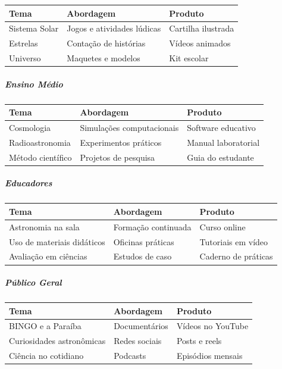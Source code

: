 \bigskip\noindent
\begin{tabular}{p{}p{}p{}}
\toprule
Tema & Abordagem & Produto \\
\hline
Sistema Solar & Jogos e atividades lúdicas & Cartilha ilustrada \\
Estrelas & Contação de histórias & Vídeos animados \\
Universo & Maquetes e modelos & Kit escolar \\
\bottomrule
\end{tabular}

\bigskip

\subparagraph{Ensino Médio}

\bigskip\noindent
\begin{tabular}{p{}p{}p{}}
\toprule
Tema & Abordagem & Produto \\
\hline
Cosmologia & Simulações computacionais & Software educativo \\
Radioastronomia & Experimentos práticos & Manual laboratorial \\
Método científico & Projetos de pesquisa & Guia do estudante \\
\bottomrule
\end{tabular}

\bigskip

\subparagraph{Educadores}

\bigskip\noindent
\begin{tabular}{p{}p{}p{}}
\toprule
Tema & Abordagem & Produto \\
\hline
Astronomia na sala & Formação continuada & Curso online \\
Uso de materiais didáticos & Oficinas práticas & Tutoriais em vídeo \\
Avaliação em ciências & Estudos de caso & Caderno de práticas \\
\bottomrule
\end{tabular}

\bigskip

\subparagraph{Público Geral}

\bigskip\noindent
\begin{tabular}{p{}p{}p{}}
\toprule
Tema & Abordagem & Produto \\
\hline
BINGO e a Paraíba & Documentários & Vídeos no YouTube \\
Curiosidades astronômicas & Redes sociais & Posts e reels \\
Ciência no cotidiano & Podcasts & Episódios mensais \\
\bottomrule
\end{tabular}

